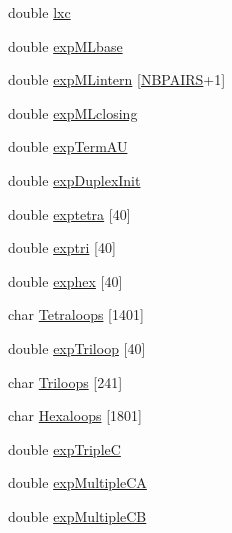 \begin{DoxyCompactItemize}
\item 
double \mbox{\hyperlink{group__energy__parameters_acbceb6027e4aa73cf216712617d8ab02}{lxc}}
\item 
double \mbox{\hyperlink{group__energy__parameters_aef32ae2492725def74065fcc0f0a5f04}{exp\+M\+Lbase}}
\item 
double \mbox{\hyperlink{group__energy__parameters_acb1b64f42c607ada107e05262eb3d3c7}{exp\+M\+Lintern}} \mbox{[}\mbox{\hyperlink{energy__const_8h_a5e75221c779d618eab81e096f37e32ce}{N\+B\+P\+A\+I\+RS}}+1\mbox{]}
\item 
double \mbox{\hyperlink{group__energy__parameters_afdfbc240dc615d45fa5e9f0e8d4f8026}{exp\+M\+Lclosing}}
\item 
double \mbox{\hyperlink{group__energy__parameters_a9040df20dfcfeabaef375edb88a15326}{exp\+Term\+AU}}
\item 
double \mbox{\hyperlink{group__energy__parameters_ad6206b8edd6bdb01887c905423e2abb9}{exp\+Duplex\+Init}}
\item 
double \mbox{\hyperlink{group__energy__parameters_ad2751af5816c82fcceacf9d496b1e9c9}{exptetra}} \mbox{[}40\mbox{]}
\item 
double \mbox{\hyperlink{group__energy__parameters_a076792cfccdc10ace2dbe2b7a8d3c5df}{exptri}} \mbox{[}40\mbox{]}
\item 
double \mbox{\hyperlink{group__energy__parameters_a193c26eb7ea79e91b4dcb89b87e7926e}{exphex}} \mbox{[}40\mbox{]}
\item 
char \mbox{\hyperlink{group__energy__parameters_aff2006d0ead3d1de216a9a7f0680fdc2}{Tetraloops}} \mbox{[}1401\mbox{]}
\item 
double \mbox{\hyperlink{group__energy__parameters_a91650cc682967f5914097c9a99e4f693}{exp\+Triloop}} \mbox{[}40\mbox{]}
\item 
char \mbox{\hyperlink{group__energy__parameters_a309a8d464478a36963c36d91110920b6}{Triloops}} \mbox{[}241\mbox{]}
\item 
char \mbox{\hyperlink{group__energy__parameters_a771e437bb84e669d7a561f342ebbed33}{Hexaloops}} \mbox{[}1801\mbox{]}
\item 
double \mbox{\hyperlink{group__energy__parameters_ab31a5df72a249faea0ce4a8e95c18244}{exp\+TripleC}}
\item 
double \mbox{\hyperlink{group__energy__parameters_abf12e9cdf6688361080e70c29bc15133}{exp\+Multiple\+CA}}
\item 
double \mbox{\hyperlink{group__energy__parameters_a0b5a9b6ce171cd239250b4287f57aa23}{exp\+Multiple\+CB}}
\item 

\end{DoxyCompactItemize}
